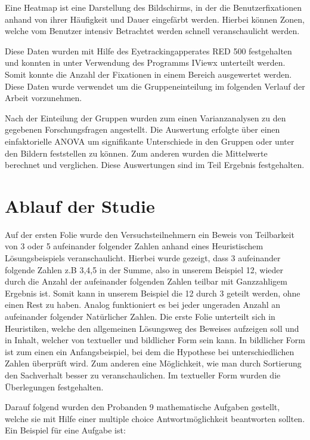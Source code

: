 Eine Heatmap ist eine Darstellung des Bildschirms, in der die Benutzerfixationen anhand von ihrer Häufigkeit und Dauer eingefärbt werden. Hierbei können Zonen, welche vom Benutzer intensiv Betrachtet werden schnell veranschaulicht werden.

Diese Daten wurden mit Hilfe des Eyetrackingapperates RED 500 festgehalten und konnten in unter Verwendung des Programms IViewx unterteilt werden. Somit konnte die Anzahl der Fixationen in einem Bereich ausgewertet werden. Diese Daten wurde verwendet um die Gruppeneinteilung im folgenden Verlauf der Arbeit vorzunehmen.

Nach der Einteilung der Gruppen wurden zum einen Varianzanalysen zu den gegebenen Forschungsfragen angestellt. Die Auswertung erfolgte über einen einfaktorielle ANOVA um signifikante Unterschiede in den Gruppen oder unter den Bildern feststellen zu können. Zum anderen wurden die Mittelwerte berechnet und verglichen. Diese Auswertungen sind im Teil Ergebnis festgehalten.

\section{Ablauf der Studie}

Auf der ersten Folie wurde den Versuchsteilnehmern ein Beweis von Teilbarkeit  von 3 oder 5 aufeinander folgender Zahlen anhand eines Heuristischem Lösungsbeispiels veranschaulicht. Hierbei wurde gezeigt, dass 3 aufeinander folgende Zahlen z.B 3,4,5 in der Summe, also in unserem Beispiel 12, wieder durch die Anzahl der aufeinander folgenden Zahlen teilbar mit Ganzzahligem Ergebnis ist. Somit kann in unserem Beispiel die 12 durch 3 geteilt werden, ohne einen Rest zu haben.
Analog funktioniert es bei jeder ungeraden Anzahl an aufeinander folgender Natürlicher Zahlen. Die erste Folie unterteilt sich in Heuristiken, welche den allgemeinen Lösungsweg des Beweises aufzeigen soll und in Inhalt, welcher von textueller und bildlicher Form sein kann. In bildlicher Form ist zum einen ein Anfangsbeispiel, bei dem die Hypothese bei unterschiedlichen Zahlen überprüft wird. Zum anderen eine Möglichkeit, wie man durch Sortierung den Sachverhalt besser zu veranschaulichen. Im textueller Form wurden die Überlegungen festgehalten.

Darauf folgend wurden den Probanden 9 mathematische Aufgaben gestellt, welche sie mit Hilfe einer multiple choice Antwortmöglichkeit beantworten sollten. Ein Beispiel für eine Aufgabe ist:


